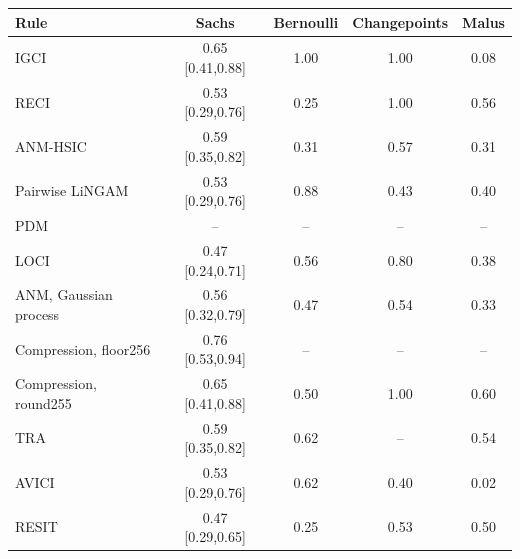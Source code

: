\begin{table}[ht]
\begin{tabular}{@{}lcccc@{}}
\toprule
Rule & Sachs & Bernoulli & Changepoints & Malus\\
\midrule
IGCI & 0.65 [0.41,0.88] & 1.00 & 1.00 & 0.08\\
RECI & 0.53 [0.29,0.76] & 0.25 & 1.00 & 0.56\\
ANM-HSIC & 0.59 [0.35,0.82] & 0.31 & 0.57 & 0.31\\
Pairwise LiNGAM & 0.53 [0.29,0.76] & 0.88 & 0.43 & 0.40\\
PDM & -- & -- & -- & --\\
LOCI & 0.47 [0.24,0.71] & 0.56 & 0.80 & 0.38\\
ANM, Gaussian process & 0.56 [0.32,0.79] & 0.47 & 0.54 & 0.33\\
Compression, floor256 & 0.76 [0.53,0.94] & -- & -- & --\\
Compression, round255 & 0.65 [0.41,0.88] & 0.50 & 1.00 & 0.60\\
TRA & 0.59 [0.35,0.82] & 0.62 & -- & 0.54\\
AVICI & 0.53 [0.29,0.76] & 0.62 & 0.40 & 0.02\\
RESIT & 0.47 [0.29,0.65] & 0.25 & 0.53 & 0.50\\
\bottomrule
\end{tabular}
\end{table}

